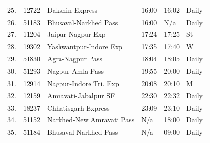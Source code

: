 \documentclass{article}
\begin{document}
\begin{tabular}{llllll}
25. & 12722 & Dakshin Express & 16:00 & 16:02 & Daily \\
26. & 51183 & Bhusaval-Narkhed Pass & 16:00 & N/a & Daily \\
27. & 11204 & Jaipur-Nagpur Exp & 17:24 & 17:25 & St \\
28. & 19302 & Yashwantpur-Indore Exp & 17:35 & 17:40 & W \\
29. & 51830 & Agra-Nagpur Pass & 18:04 & 18:05 & Daily \\
30. & 51293 & Nagpur-Amla Pass & 19:55 & 20:00 & Daily \\
31. & 12914 & Nagpur-Indore Tri. Exp & 20:08 & 20:10 & M \\
32. & 12159 & Amravati-Jabalpur SF & 22:30 & 22:32 & Daily \\
33. & 18237 & Chhatisgarh Express & 23:09 & 23:10 & Daily \\
34. & 51152 & Narkhed-New Amravati Pass & N/a & 18:00 & Daily \\
35. & 51184 & Bhusaval-Narkhed Pass & N/a & 09:00 & Daily \\
\bottomrule
\end{tabular}
\end{document}
